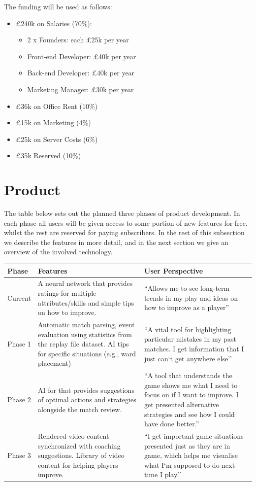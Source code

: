 \documentclass[12pt]{article} %
\let\oldsection\section
\renewcommand\section{\clearpage\oldsection}
\begin{document}
The funding will be used as follows:

\begin{itemize}
\item \pounds240k on Salaries (70\%):
\begin{itemize}
\item 2 x Founders: each \pounds25k per year
\item Front-end Developer: \pounds40k per year
\item Back-end Developer: \pounds40k per year
\item Marketing Manager: \pounds30k per year 
\end{itemize}
\item \pounds36k on Office Rent (10\%)
\item \pounds15k on Marketing (4\%)
\item \pounds25k on Server Costs (6\%)
\item \pounds35k Reserved (10\%)
\end{itemize}

\section{Product}

The table below sets out the planned three phases of product development. In each phase all users will be given access to some portion of new features for free, whilst the rest are reserved for paying subscribers. In the rest of this subsection we describe the features in more detail, and in the next section we give an overview of the involved technology.

\begin{center}
\onehalfspacing
    \begin{tabular}{ | l | p{6cm} | p{6cm} |}
    \hline
    Phase & Features  & User Perspective\\ \hline
    Current & A neural network that provides ratings for multiple attributes/skills and simple tips on how to improve.
 &``Allows me to see long-term trends in my play and ideas on how to improve as a player''\\  \hline
    Phase 1 & Automatic match parsing, event evaluation using statistics from the replay file dataset. AI tips for specific situations (e.g., ward placement)
 & ``A vital tool for highlighting particular mistakes in my past matches. I get information that I just can`t get anywhere else'' \\ \hline
    Phase 2 & AI for that provides suggestions of optimal actions and strategies alongside the match review.  & ``A tool that understands the game shows me what I need to focus on if I want to improve. I get presented alternative strategies and see how I could have done better.''  \\
    \hline
     Phase 3 & Rendered video content synchronized with coaching suggestions. Library of video content for helping players improve. & ``I get important game situations presented just as they are in game, which helps me visualise what I`m supposed to do next time I play.'' \\
    \hline
    \end{tabular}
\end{center}
\pagebreak
\end{document}

